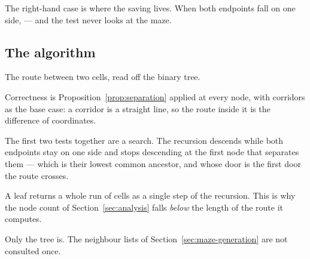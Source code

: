 

\begin{keypoint}
The right-hand case is where the saving lives. When both endpoints fall on one
side,  --- and the test
never looks at the maze.
\end{keypoint}

\subsection{The algorithm}

\begin{algorithm}[H]
\caption{The route between two cells, read off the binary tree.}
\label{alg:region-route}
\BlankLine
{}
\end{algorithm}

Correctness is Proposition~\ref{prop:separation} applied at every node, with
corridors as the base case: a corridor is a straight line, so the route inside
it is the difference of coordinates.

The first two tests together are a  search. The
recursion descends while both endpoints stay on one side and stops descending
at the first node that separates them --- which is their lowest common ancestor,
and whose door is the first door the route crosses.

\begin{description}[leftmargin=*,style=nextline,itemsep=5pt]
  \item[A corridor costs one visit, not its length.] A leaf returns a whole run
    of cells as a single step of the recursion. This is why the node count of
    Section~\ref{sec:analysis} falls \emph{below} the length of the route it
    computes.
  \item[The graph is never read.] Only the tree is. The neighbour lists of
    Section~\ref{sec:maze-generation} are not consulted once.
\end{description}

